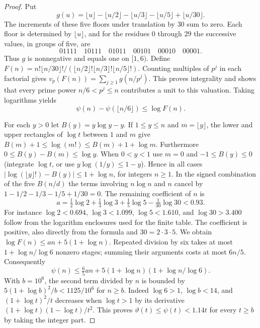 \begin{proof}
Put
\[
 g(u)=\lfloor u\rfloor-\lfloor u/2\rfloor-\lfloor u/3\rfloor
        -\lfloor u/5\rfloor+\lfloor u/30\rfloor .
\]
The increments of these five floors under translation by $30$ sum to zero. Each floor is determined by $\lfloor u\rfloor$, and for the residues $0$ through $29$ the successive values, in groups of five, are
\[
 01111\quad10111\quad01011\quad00101\quad00010\quad00001 .
\]
Thus $g$ is nonnegative and equals one on $[1,6)$. Define $F(n)=n!\lfloor n/30\rfloor!/(\lfloor n/2\rfloor!\lfloor n/3\rfloor!\lfloor n/5\rfloor!)$. Counting multiples of $p^j$ in each factorial gives
$v_p(F(n))=\sum_{j\ge1}g(n/p^j)$. This proves integrality and shows that every prime power $n/6<p^j\le n$ contributes a unit to this valuation. Taking logarithms yields
\[
 \psi(n)-\psi(\lfloor n/6\rfloor)\le\log F(n).
\]

For each $y>0$ let $B(y)=y\log y-y$. If $1\le y\le n$ and $m=\lfloor y\rfloor$, the lower and upper rectangles of $\log t$ between $1$ and $m$ give
$B(m)+1\le\log(m!)\le B(m)+1+\log m$. Furthermore $0\le B(y)-B(m)\le\log y$. When $0<y<1$ use $m=0$ and $-1\le B(y)\le0$ (integrate $\log t$, or use $y\log(1/y)\le1-y$). Hence in all cases
$|\log(\lfloor y\rfloor!)-B(y)|\le1+\log n$, for integers $n\ge1$. In the signed combination of the five $B(n/d)$ the terms involving $n\log n$ and $n$ cancel by $1-1/2-1/3-1/5+1/30=0$. The remaining coefficient of $n$ is
\[
 a=\tfrac12\log2+\tfrac13\log3+\tfrac15\log5-\tfrac1{30}\log30<0.93 .
\]
For instance $\log2<0.694$, $\log3<1.099$, $\log5<1.610$, and $\log30>3.400$ follow from the logarithm enclosures used for the finite table. The coefficient is positive, also directly from the formula and $30=2\cdot3\cdot5$. We obtain $\log F(n)\le a n+5(1+\log n)$. Repeated division by six takes at most $1+\log n/\log6$ nonzero stages; summing their arguments costs at most $6n/5$. Consequently
\[
 \psi(n)\le\tfrac65 a n+5(1+\log n)(1+\log n/\log6).
\]
With $b=10^6$, the second term divided by $n$ is bounded by $5(1+\log b)^2/b<1125/10^6$ for $n\ge b$. Indeed $\log6>1$, $\log b<14$, and $(1+\log t)^2/t$ decreases when $\log t>1$ by its derivative $(1+\log t)(1-\log t)/t^2$. This proves $\vartheta(t)\le\psi(t)<1.14t$ for every $t\ge b$ by taking the integer part.


\end{proof}
